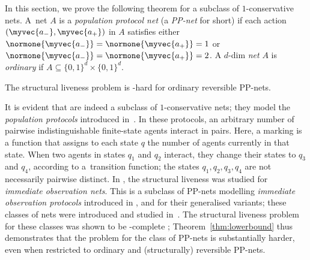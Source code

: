 In this section, we prove the following theorem for a subclass
of $1$-conservative nets.
A~net $A$ is a
\emph{population protocol net} (a \emph{PP-net} for short) if each action
$(\myvec{a_-},\myvec{a_+})$ in $A$ satisfies either
$\normone{\myvec{a_-}} = \normone{\myvec{a_+}} = 1$ or
$\normone{\myvec{a_-}} = \normone{\myvec{a_+}} = 2$.
A $d$-dim \emph{net} $A$ is \emph{ordinary} if $A\subseteq \{0,1\}^d\times\{0,1\}^d$. 

\begin{thm}\label{thm:lowerbound}
	The structural liveness problem is
    \EXPSPACE-hard for ordinary reversible PP-nets.
\end{thm}

\begin{rem}
It is evident that \ppnets are indeed a subclass of
$1$-conservative nets; they model the \emph{population
protocols} introduced
in~\cite{DBLP:journals/dc/AngluinADFP06}. In these protocols,
an arbitrary number of pairwise indistinguishable
finite-state agents interact in pairs. 
Here, a marking is a function that assigns to each state $q$ the
number of agents currently in that state.
When two
agents in states $q_1$ and $q_2$ interact, they
change their states to $q_3$ and $q_4$, 
according to a~transition function; the states $q_1,q_2,q_3,q_4$ are
not necessarily pairwise distinct. In \cite{DBLP:journals/fuin/JancarV22},
 the structural liveness was studied  for \emph{immediate observation
nets}. This is a subclass of
PP-nets modelling \emph{immediate observation protocols} introduced in
\cite{DBLP:journals/dc/AngluinAER07}, 
and for their generalised variants; these classes of nets
were introduced and studied
in~\cite{DBLP:conf/apn/EsparzaRW19,DBLP:conf/rp/RaskinW20,DBLP:conf/concur/RaskinWE20,DBLP:phd/dnb/Weil-Kennedy23}.
The structural liveness problem for these classes was shown to be 
\PSPACE-complete \cite{DBLP:journals/fuin/JancarV22};
Theorem~\ref{thm:lowerbound} thus demonstrates that the problem for the class
of PP-nets is substantially harder, even when restricted to ordinary
and (structurally) reversible PP-nets.
\end{rem}

